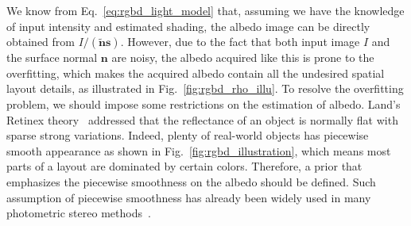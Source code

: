 We know from Eq.~\ref{eq:rgbd_light_model} that, assuming we have the knowledge of input intensity and estimated shading, the albedo image can be directly obtained from $I/(\tilde{\mathbf{n}}\mathbf{s})$.
However, due to the fact that both input image $I$ and the surface normal $\mathbf{n}$ are noisy, the albedo acquired like this is prone to the overfitting, which makes the acquired albedo contain all the undesired spatial layout details, as illustrated in Fig.~\ref{fig:rgbd_rho_illu}.
To resolve the overfitting problem, we should impose some restrictions on the estimation of albedo.
Land's Retinex theory~\cite{land1971lightness} addressed that the reflectance of an object is normally flat with sparse strong variations.
Indeed, plenty of real-world objects has piecewise smooth appearance as shown in Fig.~\ref{fig:rgbd_illustration}, which means most parts of a layout are dominated by certain colors.
Therefore, a prior that emphasizes the piecewise smoothness on the albedo should be defined.
Such assumption of piecewise smoothness has already been widely used in many photometric stereo methods~\cite{alldrin2008photometric,queau2015solving}.

